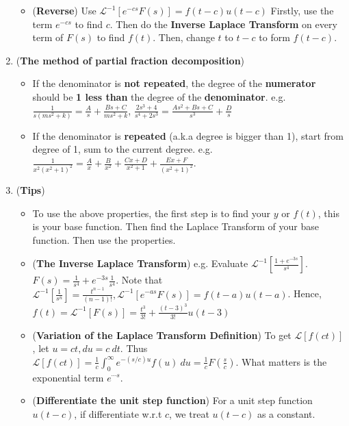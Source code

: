 \documentclass[10pt, landscape]{article}
\begin{document}
\begin{multicols}{4}
\begin{enumerate}
\begin{itemize}
        \item (\textbf{Reverse}) Use $\mathcal{L}^{-1}[e^{-cs}F(s)]=f(t-c)u(t-c)$ Firstly, use the term $e^{-cs}$ to find $c$. Then do the \textbf{Inverse Laplace Transform} on every term of $F(s)$ to find $f(t)$. Then, change $t$ to $t-c$ to form $f(t-c)$.
    \end{itemize}
    \item (\textbf{The method of partial fraction decomposition})
    \begin{itemize}
        \item If the denominator is \textbf{not repeated}, the degree of the \textbf{numerator} should be \textbf{1 less than} the degree of the \textbf{denominator}. e.g. $\frac{1}{s(ms^2+k)}=\frac{A}{s}+\frac{Bs+C}{ms^2+k}$, $\frac{2s^3+4}{s^4+2s^3}=\frac{As^2+Bs+C}{s^3}+\frac{D}{s}$
        \item If the denominator is \textbf{repeated} (a.k.a degree is bigger than 1), start from degree of 1, sum to the current degree. e.g. $\frac{1}{x^2(x^2+1)^2}=\frac{A}{x}+\frac{B}{x^2}+\frac{Cx+D}{x^2+1}+\frac{Ex+F}{(x^2+1)^2}$.
    \end{itemize}
    \item (\textbf{Tips})
    \begin{itemize}
        \item To use the above properties, the first step is to find your $y\text{ or }f(t)$, this is your base function. Then find the Laplace Transform of your base function. Then use the properties.
        \item (\textbf{The Inverse Laplace Transform}) e.g. Evaluate $\mathcal{L}^{-1}[\frac{1+e^{-3s}}{s^4}]$. $F(s)=\frac{1}{s^4}+e^{-3s}\frac{1}{s^4}$. Note that $\mathcal{L}^{-1}[\frac{1}{s^n}]=\frac{t^{n-1}}{(n-1)!}, \mathcal{L}^{-1}[e^{-as}F(s)]=f(t-a)u(t-a)$. Hence, $f(t)=\mathcal{L}^{-1}[F(s)]=\frac{t^3}{3!}+\frac{(t-3)^3}{3!}u(t-3)$
        \item (\textbf{Variation of the Laplace Transform Definition}) To get $\mathcal{L}[f(ct)]$, let $u=ct, du=c~dt$. Thus $\mathcal{L}[f(ct)]=\frac{1}{c}\int_{0}^{\infty}e^{-(s/c)u}f(u)~du=\frac{1}{c}F(\frac{s}{c})$. What matters is the exponential term $e^{\cdots s}$.
        \item (\textbf{Differentiate the unit step function}) For a unit step function $u(t-c)$, if differentiate w.r.t $c$, we treat $u(t-c)$ as a constant.
    \end{itemize}
\end{enumerate}

\end{multicols}
\end{document}
